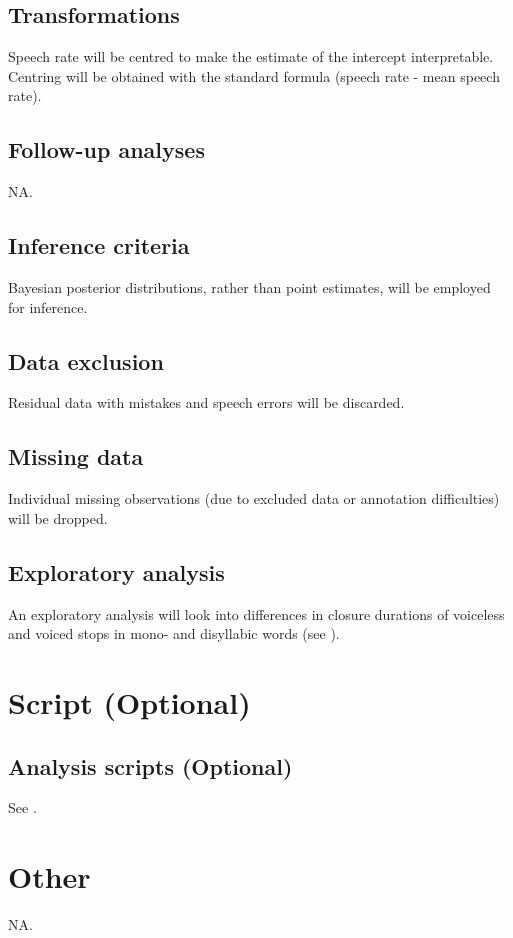 \documentclass[11pt,]{article}
\begin{document}
\hypertarget{transformations}{%
\subsection{Transformations}\label{transformations}}

Speech rate will be centred to make the estimate of the intercept
interpretable. Centring will be obtained with the standard formula
(speech rate - mean speech rate).

\hypertarget{follow-up-analyses}{%
\subsection{Follow-up analyses}\label{follow-up-analyses}}

NA.

\hypertarget{inference-criteria}{%
\subsection{Inference criteria}\label{inference-criteria}}

Bayesian posterior distributions, rather than point estimates, will be
employed for inference.

\hypertarget{data-exclusion}{%
\subsection{Data exclusion}\label{data-exclusion}}

Residual data with mistakes and speech errors will be discarded.

\hypertarget{missing-data}{%
\subsection{Missing data}\label{missing-data}}

Individual missing observations (due to excluded data or annotation
difficulties) will be dropped.

\hypertarget{exploratory-analysis}{%
\subsection{Exploratory analysis}\label{exploratory-analysis}}

An exploratory analysis will look into differences in closure durations
of voiceless and voiced stops in mono- and disyllabic words (see
).

\hypertarget{script-optional}{%
\section{Script (Optional)}\label{script-optional}}

\hypertarget{analysis-scripts-optional}{%
\subsection{Analysis scripts
(Optional)}\label{analysis-scripts-optional}}

See .

\hypertarget{other}{%
\section{Other}\label{other}}

NA.


\end{document}
